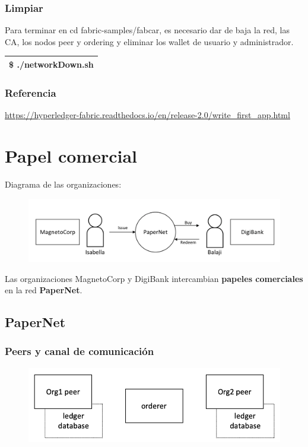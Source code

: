 \documentclass{beamer}
\begin{document}
	\begin{frame}
		\frametitle{Limpiar}
		Para terminar en cd fabric-samples/fabcar, es necesario dar de baja la red, las CA, los nodos peer y ordering y eliminar los wallet de usuario y administrador.
		\begin{center}
			\begin{tabulary}{\linewidth}{L}
				\hline
				\$ ./networkDown.sh \\
				\hline
			\end{tabulary} 
		\end{center}
	\end{frame}
	
	\begin{frame}
		\frametitle{Referencia}
		\begin{center}
			\url{https://hyperledger-fabric.readthedocs.io/en/release-2.0/write_first_app.html}
		\end{center}
	\end{frame}
	
	\section{Papel comercial}
	
	\begin{frame}
		Diagrama de las organizaciones:
		\begin{figure}[h]
			\includegraphics[scale=.5]{papernet_01}
			\centering
		\end{figure}
		Las organizaciones MagnetoCorp y DigiBank intercambian \textbf{papeles comerciales} en la red \textbf{PaperNet}.
	\end{frame}
	
	\subsection{PaperNet}

	\begin{frame}
		\frametitle{Peers y canal de comunicación}
		\begin{figure}[h]
			\includegraphics[scale=.5]{papernet_02}
			\centering
		\end{figure}
	\end{frame}
	
\end{document}
